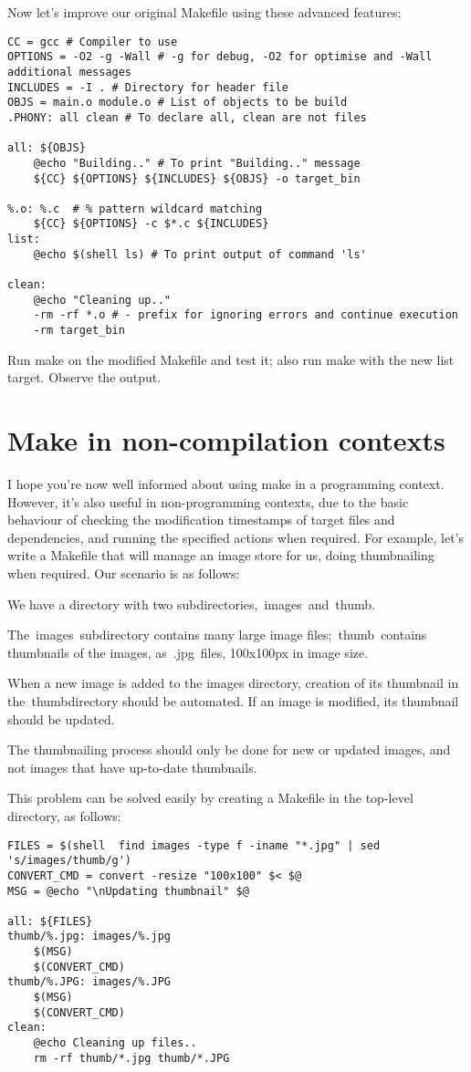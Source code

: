 \documentclass[output=paper, 
colorlinks,
citecolor=brown,
newtxmath
]{langscibook}
\begin{document}
Now let’s improve our original Makefile using these advanced features:

\begin{verbatim}
CC = gcc # Compiler to use
OPTIONS = -O2 -g -Wall # -g for debug, -O2 for optimise and -Wall additional messages
INCLUDES = -I . # Directory for header file
OBJS = main.o module.o # List of objects to be build
.PHONY: all clean # To declare all, clean are not files
 
all: ${OBJS}
    @echo "Building.." # To print "Building.." message
    ${CC} ${OPTIONS} ${INCLUDES} ${OBJS} -o target_bin 
 
%.o: %.c  # % pattern wildcard matching
    ${CC} ${OPTIONS} -c $*.c ${INCLUDES}
list:
    @echo $(shell ls) # To print output of command 'ls'
 
clean:
    @echo "Cleaning up.."
    -rm -rf *.o # - prefix for ignoring errors and continue execution
    -rm target_bin
\end{verbatim}

Run make on the modified Makefile and test it; also run make with the new list target. Observe the output.

\section {Make in non-compilation contexts}

I hope you’re now well informed about using make in a programming context. However, it’s also useful in non-programming contexts, due to the basic behaviour of checking the modification timestamps of target files and dependencies, and running the specified actions when required. For example, let’s write a Makefile that will manage an image store for us, doing thumbnailing when required. Our scenario is as follows:

We have a directory with two subdirectories, images and thumb.

The images subdirectory contains many large image files; thumb contains thumbnails of the images, as .jpg files, 100x100px in image size.

When a new image is added to the images directory, creation of its thumbnail in the thumbdirectory should be automated. If an image is modified, its thumbnail should be updated.

The thumbnailing process should only be done for new or updated images, and not images that have up-to-date thumbnails.

This problem can be solved easily by creating a Makefile in the top-level directory, as follows:

\begin{verbatim}
FILES = $(shell  find images -type f -iname "*.jpg" | sed 's/images/thumb/g')
CONVERT_CMD = convert -resize "100x100" $< $@
MSG = @echo "\nUpdating thumbnail" $@
 
all: ${FILES}
thumb/%.jpg: images/%.jpg
    $(MSG)
    $(CONVERT_CMD)
thumb/%.JPG: images/%.JPG
    $(MSG)
    $(CONVERT_CMD)
clean:
    @echo Cleaning up files..
    rm -rf thumb/*.jpg thumb/*.JPG
\end{verbatim}
\end{document}
